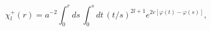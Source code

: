 \begin{equation}
\label{Eq_0231}
\chi^{+}_l(r) = a^{-2} \int^r_0 ds \, \int^s_0 dt \,
  (t/s)^{2l + 1} e^{2e[\varphi(t) - \varphi(s)]},
\end{equation}

